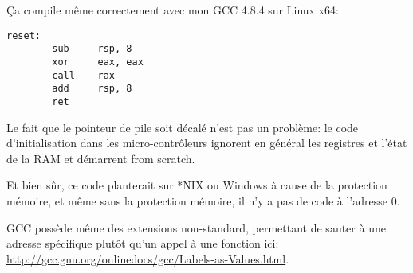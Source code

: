 Ça compile même correctement avec mon GCC 4.8.4 sur Linux x64:

\begin{lstlisting}[style=customasmx86]
reset:
        sub     rsp, 8
        xor     eax, eax
        call    rax
        add     rsp, 8
        ret
\end{lstlisting}

Le fait que le pointeur de pile soit décalé n'est pas un problème: le code d'initialisation
dans les micro-contrôleurs ignorent en général les registres et l'état de la \ac{RAM}
et démarrent from scratch.

Et bien sûr, ce code planterait sur *NIX ou Windows à cause de la protection mémoire,
et même sans la protection mémoire, il n'y a pas de code à l'adresse 0.

GCC possède même des extensions non-standard, permettant de sauter à une adresse spécifique
plutôt qu'un appel à une fonction ici:
\url{http://gcc.gnu.org/onlinedocs/gcc/Labels-as-Values.html}.


